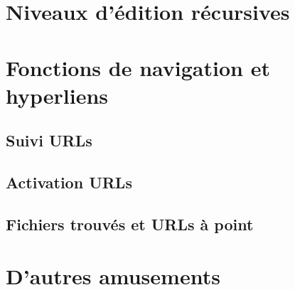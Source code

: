 \section{Niveaux d'édition récursives}

\section{Fonctions de navigation et hyperliens}
\subsection{Suivi URLs}
\subsection{Activation URLs}
\subsection{Fichiers trouvés et URLs à point}

\section{D'autres amusements}
